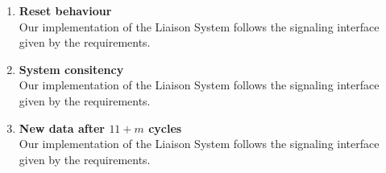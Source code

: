\begin{enumerate}
\item{\textbf{Reset behaviour}} \hfill\\
    Our implementation of the Liaison System follows the signaling interface given by the requirements.


\item{\textbf{System consitency}} \hfill\\
    Our implementation of the Liaison System follows the signaling interface given by the requirements.

\item{\textbf{New data after $11+m$ cycles}} \hfill\\
    Our implementation of the Liaison System follows the signaling interface given by the requirements.

\end{enumerate}
